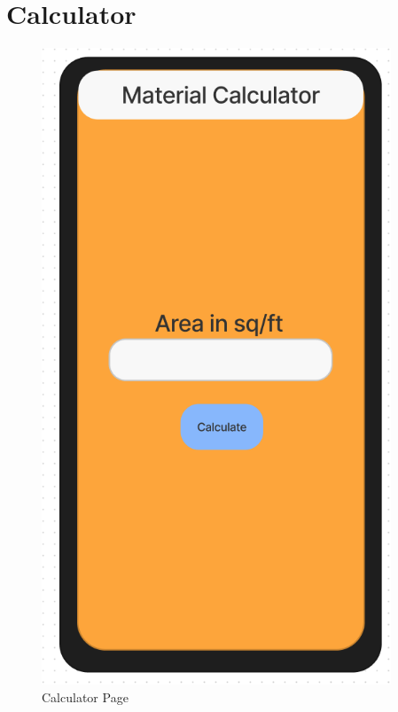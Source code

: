 \documentclass[title page]{article}
\begin{document}
\section{Calculator}
\begin{figure}[!h]
    \begin{center}
          \includegraphics[height=19cm]{calculator.png}
          \caption{Calculator Page}
          \label{fig:calculator}
    \end{center}
\end{figure}
\end{document}
